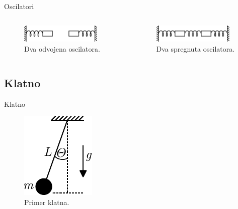 \documentclass[aspectratio=169,xcolor=dvipsnames]{beamer}
\begin{document}
\begin{frame}{Oscilatori}
	\begin{columns}[c]
    \begin{column}{.5\textwidth}
    \begin{figure}
        \centering
        \includegraphics[width=0.9\textwidth]{master_fig/dva_odvojena_osc.pdf}
        \caption{Dva odvojena oscilatora.}
    \end{figure}      
    \end{column}
    \begin{column}{.5\textwidth}
    \begin{figure}
        \centering
        \includegraphics[width=0.9\textwidth]{master_fig/spregnuti_osc.pdf}
        \caption{Dva spregnuta oscilatora.}
    \end{figure}
    \end{column}
\end{columns}
	
\end{frame}




\subsection{Klatno}

\begin{frame}{Klatno}
    \begin{figure}
    \includegraphics[width=0.3\linewidth]{master_fig/mat_klatno.pdf}
    \caption{Primer klatna.}
    \end{figure}
\end{frame}
\end{document}
